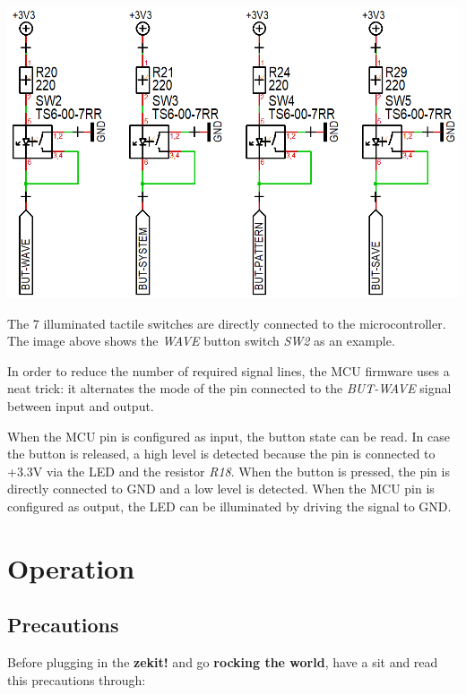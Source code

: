 \documentclass{scrartcl}
\begin{document}
\begin{center}
    \includegraphics[scale=0.35]{assets/schema-switch.png}
\end{center}

The 7 illuminated tactile switches are directly connected to the microcontroller. The image above shows the \emph{WAVE} button switch \emph{SW2} as an example.

In order to reduce the number of required signal lines, the MCU firmware uses a neat trick: it alternates the mode of the pin connected to the \emph{BUT-WAVE} signal between input and output.

When the MCU pin is configured as input, the button state can be read. In case the button is released, a high level is detected because the pin is connected to +3.3V via the LED and the resistor \emph{R18}. When the button is pressed, the pin is directly connected to GND and a low level is detected. When the MCU pin is configured as output, the LED can be illuminated by driving the signal to GND.

\pagebreak


\section{Operation}

\subsection{Precautions}
Before plugging in the \textbf{zekit!} and go \textbf{rocking the world}, have a sit and read this precautions through:
\end{document}
